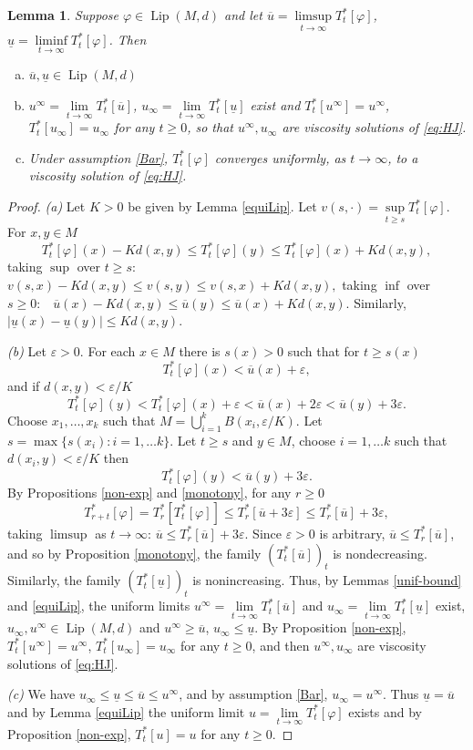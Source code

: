 \documentclass[12pt]{amsart}
\theoremstyle{plain}
\newtheorem{lemma}{Lemma}
\theoremstyle{definition}
\newcommand{\ovu}{\overline{u}}
\newcommand{\unu}{\underline{u}}
\newcommand{\fui}{\varphi}
\newcommand{\ep}{\varepsilon}
\newcommand{\Lip}{\operatorname{Lip}}
\begin{document}
  \begin{lemma}\label{main}
    Suppose $\fui\in\Lip(M,d)$ and let $\ovu=\limsup\limits_{t\to\infty}T^*_t[\fui]$,
    $\unu=\liminf\limits_{t\to\infty}T^*_t[\fui]$.
    Then
    \begin{enumerate}[(a)]
    \item $\ovu,\unu\in\Lip(M,d)$
    \item  $u^\infty=\lim\limits_{t\to\infty}T^*_t[\ovu]$,
      $u_\infty=\lim\limits_{t\to\infty}T^*_t[\unu]$ exist and  $T^*_t[u^\infty]=u^\infty$,
      $T^*_t[u_\infty]=u_\infty$ for any $t\ge 0$, so that
      $u^\infty, u_\infty$ are  viscosity solutions of \eqref{eq:HJ}.
    \item Under assumption \ref{Bar}, $T^*_t[\fui]$ converges
      uniformly, as $t\to\infty$, to a  viscosity solution of \eqref{eq:HJ}.
      \end{enumerate}
  \end{lemma}
  \begin{proof} {\it (a)} 
    Let $K>0$ be given by Lemma \ref{equiLip}.
    Let $v(s,\cdot)=\sup\limits_{t\ge s}T^*_t[\fui]$. For $x,y\in M$
    \[T^*_t[\fui](x)-Kd(x,y)\le T^*_t[\fui](y)\le T^*_t[\fui](x)+Kd(x,y),\]
    taking $\sup$ over $t\ge s:$ \, $v(s,x)-Kd(x,y)\le v(s,y)\le
    v(s,x)+Kd(x,y),$ \newline
        taking $\inf$ over $s\ge 0:$ \, $\ovu(x)-Kd(x,y)\le\ovu(y)\le\ovu(x)+Kd(x,y).$
        \newline Similarly, $|\unu(x)-\unu(y)|\le Kd(x,y)$.
        
  {\it (b)}  Let $\ep>0$. For each $x\in M$ there is $s(x)>0$ such that for $t\ge s(x)$
     \[T^*_t[\fui](x)<\ovu(x)+\ep,\]
   and if $d(x,y)<\ep/K$
     \[T^*_t[\fui](y)<T^*_t[\fui](x)+\ep<\ovu(x)+2\ep<\ovu(y)+3\ep.\]
Choose $x_1,\ldots,x_k$ such that $M=\bigcup_{i=1}^kB(x_i,\ep/K)$.
Let $s=\max\{s(x_i):i=1,\ldots k\}$. Let $t\ge s$ and $y\in M$, choose
$i=1,\ldots k$ such that $d(x_i,y)<\ep/K$ then
\[T^*_t[\fui](y)<\ovu(y)+3\ep.\]
By Propositions \ref{non-exp} and \ref{monotony}, for any $r\ge 0$
\[T^*_{r+t}[\fui]=T^*_r[T^*_t[\fui]]\le T^*_r[\ovu+3\ep]\le T^*_r[\ovu]+3\ep,\]
taking $\limsup$ as $t\to\infty$: $\ovu\le T^*_r[\ovu]+3\ep.$
Since $\ep>0$ is arbitrary, $\ovu\le T^*_r[\ovu]$, and so by Proposition \ref{monotony},
the family $(T^*_t[\ovu])_t$ is nondecreasing. Similarly, the family  $(T^*_t[\unu])_t$ is
nonincreasing. Thus, by Lemmas \ref{unif-bound} and \ref{equiLip},
the uniform limits $u^\infty=\lim\limits_{t\to\infty}T^*_t[\ovu]$
and $u_\infty=\lim\limits_{t\to\infty}T^*_t[\unu]$ exist, $u_\infty, u^\infty\in\Lip(M,d)$
and $u^\infty\ge\ovu$, $u_\infty\le\unu$.
By Proposition \ref{non-exp}, $T^*_t[u^\infty]=u^\infty$, $T^*_t[u_\infty]=u_\infty$
for any $t\ge 0$, and then $u^\infty, u_\infty$ are viscosity solutions of \eqref{eq:HJ}.

{\it (c)} We have $u_\infty\le\unu\le\ovu\le u^\infty$, and by
assumption \ref{Bar}, $u_\infty=u^\infty$. Thus $\unu=\ovu$ and by
Lemma \ref{equiLip} the uniform limit $u=\lim\limits_{t\to\infty}T^*_t[\fui]$
exists and by Proposition \ref{non-exp},
 $T^*_t[u]=u$ for any $t\ge 0$.
\end{proof}
\end{document}

